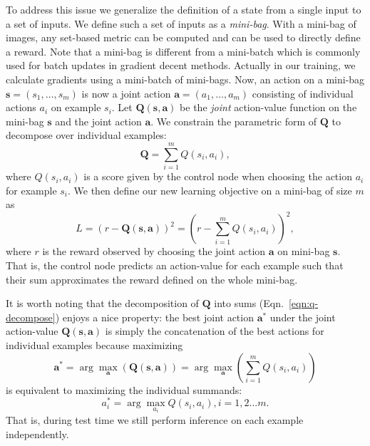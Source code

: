 \documentclass[10pt,twocolumn,letterpaper]{article}
\begin{document}
To address this issue we generalize the definition of a state from a single input to a set
of inputs. We define such a set of inputs as a \emph{mini-bag}. With a mini-bag of images, any set-based metric can be
computed and can be used to directly define a reward. Note that a mini-bag is different from a mini-batch which is commonly used for batch updates in gradient decent methods. Actually in our training, we calculate gradients using a mini-batch of mini-bags.
Now, an action on a
mini-bag $\mathbf{s} = (s_1, \ldots, s_m)$ is now a joint action $\mathbf{a} =
(a_1,\ldots,a_m)$ consisting of individual actions $a_i$ on example $s_i$. Let
$\mathbf{Q}(\mathbf{s}, \mathbf{a})$ be the \emph{joint} action-value function on the mini-bag
$\mathbf{s}$ and the joint action $\mathbf{a}$. We constrain the parametric form of $\mathbf{Q}$
to decompose over individual examples: 
\begin{equation}
\mathbf{Q} = \sum_{i=1}^m Q(s_i,a_i), 
\label{eqn:q-decompose}
\end{equation}
where $Q(s_i,a_i)$ is a score given by the control node when choosing the action $a_i$ for
example $s_i$. We then define our new
learning objective on a mini-bag of size $m$ as 
\begin{equation}
L = (r - \mathbf{Q}(\mathbf{s},\mathbf{a})) ^2 = (r - \sum_{i=1}^m Q(s_i,a_i) )^2, 
\label{qlearn-bag}
\end{equation}
where $r$ is the reward observed by choosing the joint action $\mathbf{a}$ on mini-bag
$\mathbf{s}$.  That is, the control node predicts an action-value
for each example such that their sum approximates the reward defined on the whole
mini-bag. 

It is worth noting that the decomposition of $\mathbf{Q}$ into sums 
(Eqn.~\ref{eqn:q-decompose}) enjoys a nice property: the best joint action $\mathbf{a}^*$  under the
joint action-value $\mathbf{Q}(\mathbf{s}, \mathbf{a})$
is simply the concatenation of the best actions for individual examples because
maximizing
\begin{equation} \mathbf{a}^{*} = \arg\max_{\mathbf{a}} (\mathbf{Q}(\mathbf{s},\mathbf{a})) =
\arg\max_{\mathbf{a}} ({\sum_{i=1}^m Q(s_{i},a_{i})})
\end{equation} 
is equivalent to maximizing the individual summands:
\begin{equation} a_{i}^{*} = \arg\max_{a_{i}} Q(s_{i},a_{i}), i=1,2...m.
\end{equation} 
That is, during test time we still perform inference on each example independently. 
\end{document}
